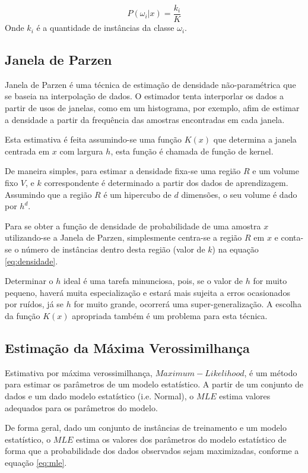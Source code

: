 \begin{equation}
\label{eq:knnposteriori}
P(\omega_i | x) = \dfrac{k_i}{K}
\end{equation}
Onde $k_i$ é a quantidade de instâncias da classe $\omega_i$.


\subsection{Janela de Parzen}
\label{subsec:janeladeparzen}

Janela de Parzen é uma técnica de estimação de densidade não-paramétrica que se baseia na interpolação de dados. O estimador tenta interporlar os dados a partir de usos de janelas, como em um histograma, por exemplo, afim de estimar a densidade a partir da frequência das amostras encontradas em cada janela.

Esta estimativa é feita assumindo-se uma função $K(x)$ que determina a janela centrada em $x$ com largura $h$, esta função é chamada de função de kernel.

De maneira simples, para estimar a densidade fixa-se uma região $R$ e um volume fixo $V$, e $k$ correspondente é determinado a partir dos dados de aprendizagem. Assumindo que a região $R$ é um hipercubo de $d$ dimensões, o seu volume é dado por $h^d$.

Para se obter a função de densidade de probabilidade de uma amostra $x$ utilizando-se a Janela de Parzen, simplesmente centra-se a região $R$ em $x$ e conta-se o número de instâncias dentro desta região (valor de $k$) na equação \ref{eq:densidade}.

Determinar o $h$ ideal é uma tarefa minunciosa, pois, se o valor de $h$ for muito pequeno, haverá muita especialização e estará mais sujeita a erros ocasionados por ruídos, já se $h$ for muito grande, ocorrerá uma super-generalização. A escolha da função $K(x)$ apropriada também é um problema para esta técnica.

\subsection{Estimação da Máxima Verossimilhança}
\label{subsec:mle}

Estimativa por máxima verossimilhança, $Maximum-Likelihood$, é um método para estimar os parâmetros de um modelo estatístico. A partir de um conjunto de dados e um dado modelo estatístico (i.e. Normal), o $MLE$ estima valores adequados para os parâmetros do modelo.

De forma geral, dado um conjunto de instâncias de treinamento e um modelo estatístico, o $MLE$ estima os valores dos parâmetros do modelo estatístico de forma que a probabilidade dos dados observados sejam maximizadas, conforme a equação \ref{eq:mle}.

